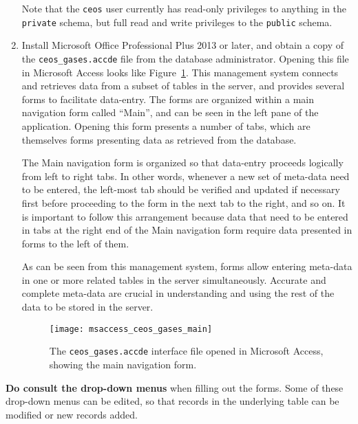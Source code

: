 \documentclass[12pt,letterpaper,titlepage,headings=small,numbers=noenddot]%
{scrartcl}
\begin{document}
\begin{enumerate}[\bfseries 1.]
  Note that the \texttt{ceos} user currently has read-only privileges to
  anything in the \texttt{private} schema, but full read and write
  privileges to the \texttt{public} schema.

\item Install Microsoft Office Professional Plus 2013 or later, and obtain
  a copy of the \texttt{ceos\_gases.accde} file from the database
  administrator.  Opening this file in Microsoft Access looks like
  Figure~\ref{fig:msaccess-db-main}.  This management system connects and
  retrieves data from a subset of tables in the server, and provides
  several forms to facilitate data-entry.  The forms are organized within a
  main navigation form called ``Main'', and can be seen in the left pane of
  the application.  Opening this form presents a number of tabs, which are
  themselves forms presenting data as retrieved from the database.

  The Main navigation form is organized so that data-entry proceeds
  logically from left to right tabs.  In other words, whenever a new set of
  meta-data need to be entered, the left-most tab should be verified and
  updated if necessary first before proceeding to the form in the next tab
  to the right, and so on.  It is important to follow this arrangement
  because data that need to be entered in tabs at the right end of the Main
  navigation form require data presented in forms to the left of them.

  As can be seen from this management system, forms allow entering
  meta-data in one or more related tables in the server simultaneously.
  Accurate and complete meta-data are crucial in understanding and using the
  rest of the data to be stored in the server.

  \begin{figure}[!tbh]
    \begin{center}
      \texttt{[image: msaccess\_ceos\_gases\_main]}
      \caption{The \texttt{ceos\_gases.accde} interface file opened in
        Microsoft Access, showing the main navigation form.}
      \label{fig:msaccess-db-main}
    \end{center}
  \end{figure}

\end{enumerate}

\textbf{Do consult the drop-down menus} when filling out the forms.  Some
of these drop-down menus can be edited, so that records in the underlying
table can be modified or new records added.
\end{document}
